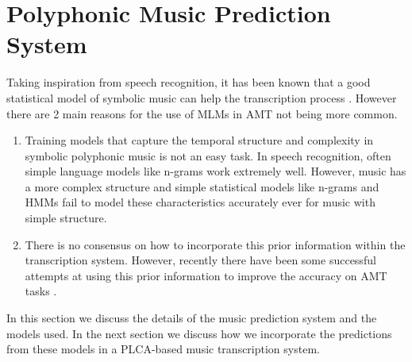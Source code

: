 \section{Polyphonic Music Prediction System} 
\label{sec:prediction}
Taking inspiration from speech recognition, it has been known that a good statistical model of symbolic music can help the transcription process \cite{Cemgil2004a}. However there are 2 main reasons for the use of MLMs in AMT not being more common. 
\begin{enumerate}
\item Training models that capture the temporal structure and complexity in symbolic polyphonic music is not an easy task. In speech recognition, often simple language models like n-grams work extremely well. However, music has a more complex structure and simple statistical models like n-grams and HMMs fail to model these characteristics accurately ever for music with simple structure\cite{Boulanger-Lewandowski2012}.
\item There is no consensus on how to incorporate this prior information within the transcription system. However, recently there have been some successful attempts at using this prior information to improve the accuracy on AMT tasks \cite{Boulanger-Lewandowski2012,Boulanger-Lewandowski2013}. 

\end{enumerate}


In this section we discuss the details of the music prediction system and the models used. In the next section we discuss how we incorporate the predictions from these models in a PLCA-based music transcription system. 


